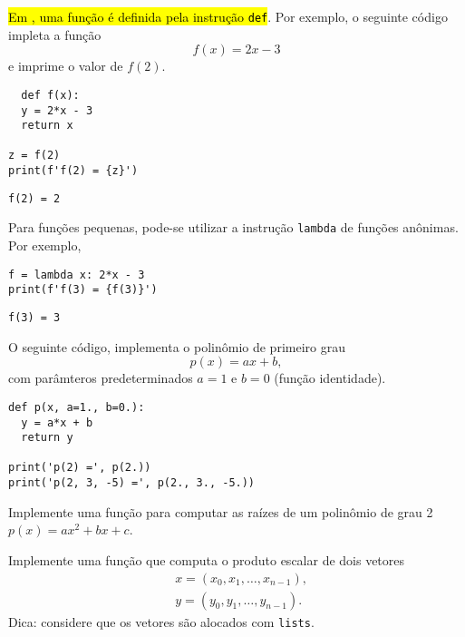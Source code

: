 \documentclass[a4paper,10pt,twoside]{article}
\begin{document}
\hl{Em {\python}, uma função é definida pela instrução \texttt{def}}. Por exemplo, o seguinte código impleta a função
\begin{equation}
  f(x) = 2x - 3
\end{equation}
e imprime o valor de $f(2)$.

\begin{lstlisting}
  def f(x):
  y = 2*x - 3
  return x

z = f(2)
print(f'f(2) = {z}')
\end{lstlisting}

\begin{verbatim}
f(2) = 2
\end{verbatim}

\begin{obs}
  Para funções pequenas, pode-se utilizar a instrução \texttt{lambda} de funções anônimas. Por exemplo,

\begin{lstlisting}
f = lambda x: 2*x - 3
print(f'f(3) = {f(3)}')
\end{lstlisting}

\begin{verbatim}
f(3) = 3
\end{verbatim}

\end{obs}

\begin{ex}
  O seguinte código, implementa o polinômio de primeiro grau
  \begin{equation}
    p(x) = ax + b,
  \end{equation}
  com parâmteros predeterminados $a=1$ e $b=0$ (função identidade).

\begin{lstlisting}
def p(x, a=1., b=0.):
  y = a*x + b
  return y

print('p(2) =', p(2.))
print('p(2, 3, -5) =', p(2., 3., -5.))
\end{lstlisting}

\end{ex}

\begin{exr}
  Implemente uma função para computar as raízes de um polinômio de grau 2 $p(x) = ax^2 + bx + c$.
\end{exr}

\begin{exr}
  Implemente uma função que computa o produto escalar de dois vetores
  \begin{align}
    &x = (x_0, x_1, \ldots, x_{n-1}),\\
    &y = (y_0, y_1, \ldots, y_{n-1}).
  \end{align}
  Dica: considere que os vetores são alocados com \texttt{lists}.
\end{exr}
\end{document}
